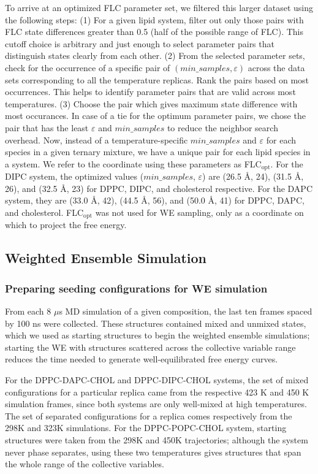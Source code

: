 \documentclass{biophys-new}
\begin{document}
To arrive at an optimized FLC parameter set, we filtered this larger dataset using the following steps:
(1) For a given lipid system, filter out only those pairs with FLC state differences greater than 0.5 (half of the possible range of FLC).
This cutoff choice is arbitrary and just enough to select parameter pairs that distinguish states clearly from each other.
(2) From the selected parameter sets, check for the occurrence of a specific pair of $(min\_samples, \varepsilon)$ across the data sets corresponding to all the temperature replicas.
Rank the pairs based on most occurrences. This helps to identify parameter pairs that are valid across most temperatures.
(3) Choose the pair which gives maximum state difference with most occurances. In case of a tie for the optimum parameter pairs, we chose the pair that has the least $\varepsilon$ and $min\_samples$ to reduce the neighbor search overhead.
Now, instead of a temperature-specific $min\_samples$ and $\varepsilon$ for each species in a given ternary mixture, we have a unique pair for each lipid species in a system. We refer to the coordinate using these parameters as FLC$_{\text{opt}}$. For the DIPC system, the optimized values ($min\_samples$, $\varepsilon$) are (26.5 {\AA}, 24), (31.5 {\AA}, 26), and (32.5 {\AA}, 23) for DPPC, DIPC, and cholesterol respective. For the DAPC system, they are (33.0 {\AA}, 42), (44.5 {\AA}, 56), and (50.0 {\AA}, 41) for DPPC, DAPC, and cholesterol. FLC$_{\text{opt}}$ was not used for WE sampling, only as a coordinate on which to project the free energy.

\subsection*{Weighted Ensemble Simulation}

\subsubsection*{Preparing seeding configurations for WE simulation} 
From each 8 $\mu$s MD simulation of a given composition, the last ten frames spaced by 100 ns were collected.
These structures contained mixed and unmixed states, which we used as starting structures to begin the weighted ensemble simulations; starting the WE with structures scattered across the collective variable range reduces the time needed to generate well-equilibrated free energy curves.

For the DPPC-DAPC-CHOL and DPPC-DIPC-CHOL systems, the set of mixed configurations for a particular replica came from the respective 423 K and 450 K simulation frames, since both systems are only well-mixed at high temperatures.
The set of separated configurations for a replica comes respectively from the 298K and 323K simulations.
For the DPPC-POPC-CHOL system, starting structures were taken from the 298K and 450K trajectories; although the system never phase separates, using these two temperatures gives structures that span the whole range of the collective variables.
\end{document}
